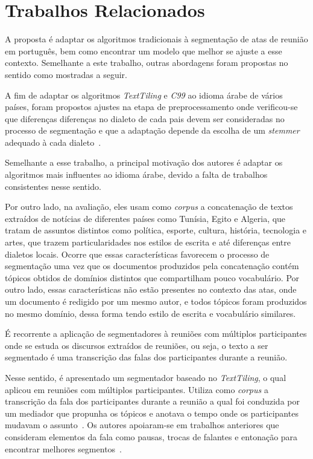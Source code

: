 \section{Trabalhos Relacionados}
	\label{sec:trabalhos}

A proposta é adaptar os algoritmos tradicionais à segmentação de atas de reunião em português, bem como encontrar um modelo que melhor se ajuste a esse contexto. Semelhante a este trabalho, outras abordagens foram propostas no sentido como mostradas a seguir.



A fim de adaptar os algoritmos \textit{TextTiling} e \textit{C99} ao idioma árabe de vários países, foram propostos ajustes na etapa de preprocessamento onde verificou-se que diferenças diferenças no dialeto de cada
pais devem ser consideradas no processo de segmentação e que a adaptação depende da escolha de um \textit{stemmer} adequado à cada dialeto~\cite{CHAIBI2014}.


Semelhante a esse trabalho, a principal motivação dos autores é adaptar os algoritmos mais influentes ao idioma árabe, devido a falta de trabalhos consistentes nesse sentido. 

Por outro lado, na avaliação, eles usam como \textit{corpus} a concatenação de textos extraídos de notícias de diferentes países como Tunísia, Egito e Algeria, que tratam de assuntos distintos como política, esporte, cultura, história, tecnologia e artes, que trazem particularidades nos estilos de escrita e até diferenças entre dialetos locais. Ocorre que essas características favorecem o processo de segmentação uma vez que os documentos produzidos pela concatenação contém tópicos obtidos de domínios distintos que compartilham pouco vocabulário. Por outro lado, essas características não estão presentes no contexto das atas, onde um documento é redigido por um mesmo autor, e todos tópicos foram produzidos no mesmo domínio, dessa forma tendo estilo de escrita e vocabulário similares.


É recorrente a aplicação de segmentadores à reuniões com múltiplos participantes onde se estuda os discursos extraídos de reuniões, ou seja, o texto a ser segmentado é uma transcrição das falas dos participantes durante a reunião.
%

Nesse sentido, é apresentado um segmentador baseado no  \textit{TextTiling}, o qual aplicou em reuniões com múltiplos participantes. Utiliza como \textit{corpus} a transcrição da fala dos participantes durante a reunião a qual foi conduzida por um mediador que propunha os tópicos e anotava o tempo onde os participantes mudavam o assunto~\cite{Banerjee2006}. 
Os autores apoiaram-se em trabalhos anteriores que consideram elementos da fala como pausas, trocas de falantes e entonação para encontrar melhores segmentos~\cite{Galley2003}.


